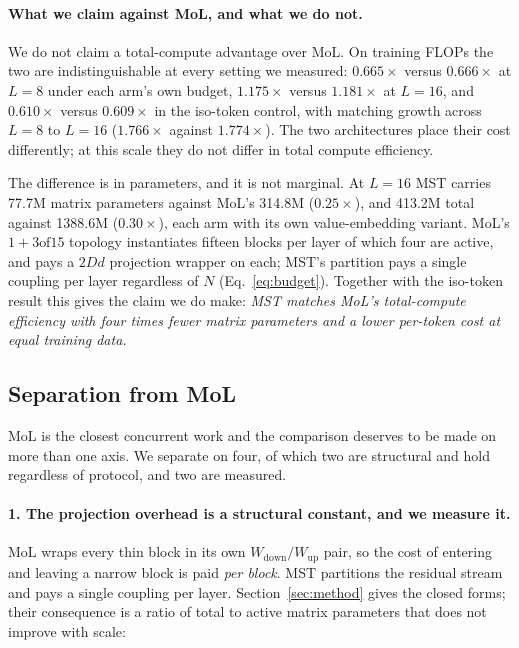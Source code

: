 \documentclass{article}
\newcommand{\dmodel}{D}
\newcommand{\dsub}{d}
\newcommand{\nsub}{N}
\begin{document}
\paragraph{What we claim against MoL, and what we do not.} We do not claim a
total-compute advantage over MoL. On training FLOPs the two are indistinguishable
at every setting we measured: $0.665\times$ versus $0.666\times$ at $L{=}8$ under
each arm's own budget, $1.175\times$ versus $1.181\times$ at $L{=}16$, and
$0.610\times$ versus $0.609\times$ in the iso-token control, with matching growth
across $L{=}8$ to $L{=}16$ ($1.766\times$ against $1.774\times$). The two
architectures place their cost differently; at this scale they do not differ in
total compute efficiency.

The difference is in parameters, and it is not marginal. At $L{=}16$ MST carries
77.7M matrix parameters against MoL's 314.8M ($0.25\times$), and 413.2M total
against 1388.6M ($0.30\times$), each arm with its own value-embedding variant.
MoL's $1{+}3\text{of}15$ topology instantiates fifteen blocks per layer of which
four are active, and pays a $2\dmodel\dsub$ projection wrapper on each; MST's
partition pays a single coupling per layer regardless of $\nsub$
(Eq.~\ref{eq:budget}). Together with the iso-token result this gives the claim we
do make: \emph{MST matches MoL's total-compute efficiency with four times fewer
matrix parameters and a lower per-token cost at equal training data.}

\subsection{Separation from MoL}
\label{sec:mol}

MoL is the closest concurrent work and the comparison deserves to be made on more
than one axis. We separate on four, of which two are structural and hold
regardless of protocol, and two are measured.

\paragraph{1. The projection overhead is a structural constant, and we measure it.}
MoL wraps every thin block in its own $W_{\mathrm{down}}/W_{\mathrm{up}}$ pair, so the cost of entering
and leaving a narrow block is paid \emph{per block}. MST partitions the residual
stream and pays a single coupling per layer. Section~\ref{sec:method} gives the
closed forms; their consequence is a ratio of total to active matrix parameters
that does not improve with scale:
\end{document}
